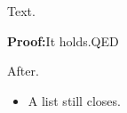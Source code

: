 \documentclass{article}
\newenvironment{myproof}{\par{\bfseries Proof:}}{\hspace*{\fill}QED\endlist\par\bigskip}
\begin{document}
Text.
\begin{myproof}It holds.\end{myproof}
After.
\begin{itemize}\item A list still closes.\end{itemize}
\end{document}
